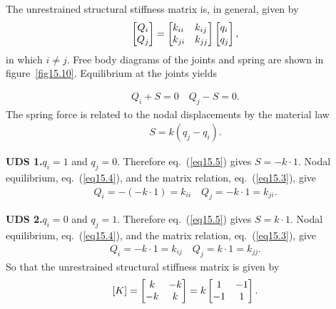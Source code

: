 \documentclass{AeroStructure-ERJohnson}
\begin{document}
The unrestrained structural stiffness matrix is, in general, given by
\begin{align}\label{eq15.3}
\left[\begin{array}{@{}c@{}}Q_{i} \\Q_{j}\end{array}\right]=\left[\begin{array}{@{}ll@{}}k_{i i} & k_{i j} \\k_{j i} & k_{j j}\end{array}\right]\left[\begin{array}{@{}l@{}}q_{i} \\q_{j}\end{array}\right],
\end{align}
in which $i \neq j$. Free body diagrams of the joints and spring are shown in figure~\ref{fig15.10}. Equilibrium at the joints yields\vspace*{-12pt}
{\def\thefigure{15.10}
}

\vspace*{-3pc}

\begin{align}\label{eq15.4}
Q_{i}+S=0 \quad Q_{j}-S=0.
\end{align}
The spring force is related to the nodal displacements by the material law
\begin{align}\label{eq15.5}
S=k\left(q_{j}-q_{i}\right).
\end{align}

\noindent\textbf{UDS 1.}\enskip $q_{i}=1$ and $q_{j}=0$. Therefore eq.~(\ref{eq15.5}) gives $S=-k \cdot 1$. Nodal equilibrium, eq.~(\ref{eq15.4}), and the matrix relation, eq.~(\ref{eq15.3}), give
\begin{align}\label{eq15.6}
Q_{i}=-(-k \cdot 1)=k_{i i} \quad Q_{j}=-k \cdot 1=k_{j i}.
\end{align}

\noindent\textbf{UDS 2.}\enskip $q_{i}=0$ and $q_{j}=1$. Therefore eq.~(\ref{eq15.5}) gives $S=k \cdot 1$. Nodal equilibrium, eq.~(\ref{eq15.4}), and the matrix relation, eq.~(\ref{eq15.3}), give
\begin{align}\label{eq15.7}
Q_{i}=-k \cdot 1=k_{i j} \quad Q_{j}=k \cdot 1=k_{j j}.
\end{align}
So that the unrestrained structural stiffness matrix is given by
\begin{align}\label{eq15.8}
[K]=\left[\begin{array}{@{}cc@{}}k & -k \\-k & k\end{array}\right]=k\left[\begin{array}{@{}cc@{}}1 & -1 \\-1 & 1\end{array}\right].
\end{align}
\end{document}
